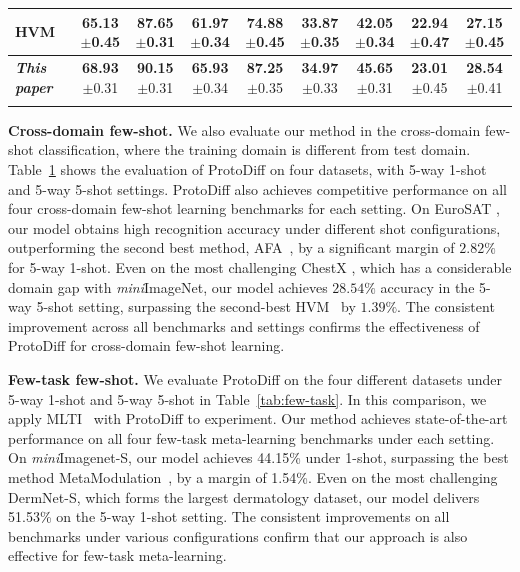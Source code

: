 \begin{table}[t]
{\begin{tabular}{l c c c c c c c c}
{HVM}~\cite{du2021hierarchical}  &{65.13}\textcolor{mygray}{\scriptsize{$\pm$0.45}}  &{87.65}\textcolor{mygray}{\scriptsize{$\pm$0.31}}  & {61.97}\textcolor{mygray}{\scriptsize{$\pm$0.34}}  &{74.88}\textcolor{mygray}{\scriptsize{$\pm$0.45}}  &{33.87}\textcolor{mygray}{\scriptsize{$\pm$0.35}}  &{42.05}\textcolor{mygray}{\scriptsize{$\pm$0.34}} & {\textbf{22.94}}\textcolor{mygray}{\scriptsize{$\pm$0.47}}  &{27.15}\textcolor{mygray}{\scriptsize{$\pm$0.45}} \\
\midrule
\rowcolor{softblue}
\textbf{\textit{This paper}}  &\textbf{68.93}\textcolor{mygray}{\scriptsize{$\pm$0.31}} & \textbf{90.15}\textcolor{mygray}{\scriptsize{$\pm$0.31}}  & \textbf{65.93}\textcolor{mygray}{\scriptsize{$\pm$0.34}} &\textbf{87.25}\textcolor{mygray}{\scriptsize{$\pm$0.35}}  &\textbf{34.97}\textcolor{mygray}{\scriptsize{$\pm$0.33}}   & \textbf{45.65}\textcolor{mygray}{\scriptsize{$\pm$0.31}}  & \textbf{23.01}\textcolor{mygray}{\scriptsize{$\pm$0.45}} &  \textbf{28.54}\textcolor{mygray}{\scriptsize{$\pm$0.41}}\\

   \bottomrule \\

\end{tabular}}
\label{tab:meta}
\vspace{-3mm}
\end{table}
\textbf{Cross-domain few-shot.}
We also evaluate our method in the cross-domain few-shot classification, where the training domain is different from test domain.
Table~\ref{tab:meta} shows the evaluation of ProtoDiff on four datasets, with 5-way 1-shot and 5-way 5-shot settings. ProtoDiff also achieves competitive performance on all four cross-domain few-shot learning benchmarks for each setting. On EuroSAT \cite{helber2019eurosat}, our model obtains high recognition accuracy under different shot configurations, outperforming the second best method, AFA~\cite{hu2022adversarial}, by a significant margin of $2.82\%$ for 5-way 1-shot. Even on the most challenging ChestX \cite{wang2017chestx}, which has a considerable domain gap with \textit{mini}ImageNet, our model achieves $28.54\%$ accuracy in the 5-way 5-shot setting, surpassing the second-best HVM~\cite{du2021hierarchical} by $1.39\%$. The consistent improvement across all benchmarks and settings confirms the effectiveness of ProtoDiff for cross-domain few-shot learning.

\textbf{Few-task few-shot.}
We evaluate ProtoDiff on the four different datasets under 5-way 1-shot and 5-way 5-shot in Table~\ref{tab:few-task}. In this comparison, we apply MLTI~\cite{yao2021meta} with ProtoDiff to experiment.
Our method achieves state-of-the-art performance on all four few-task meta-learning benchmarks under each setting.  On \textit{mini}Imagenet-S, our model achieves 44.15\% under 1-shot, surpassing the best method MetaModulation~\cite{sun23metamodulation}, by a margin of 1.54\%.  
Even on the most challenging DermNet-S, which forms the largest dermatology dataset, our model delivers 51.53\% on the 5-way 1-shot setting. The consistent improvements on all benchmarks under various configurations confirm that our approach is also effective for few-task meta-learning.

